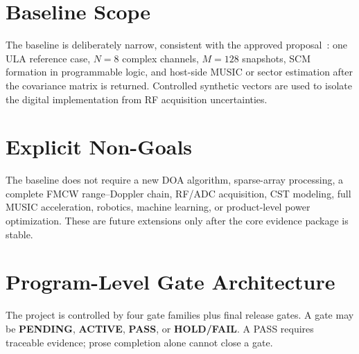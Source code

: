 \section{Baseline Scope}
The baseline is deliberately narrow, consistent with the approved proposal~\cite{molhem2026ee6800proposal}: one ULA reference case, $N=8$ complex channels,
$M=128$ snapshots, SCM formation in programmable logic, and host-side MUSIC or sector
estimation after the covariance matrix is returned. Controlled synthetic vectors are used to
isolate the digital implementation from RF acquisition uncertainties.

\section{Explicit Non-Goals}
The baseline does not require a new DOA algorithm, sparse-array processing, a complete
FMCW range--Doppler chain, RF/ADC acquisition, CST modeling, full MUSIC acceleration,
robotics, machine learning, or product-level power optimization. These are future extensions
only after the core evidence package is stable.

\section{Program-Level Gate Architecture}
The project is controlled by four gate families plus final release gates. A gate may be
\textbf{PENDING}, \textbf{ACTIVE}, \textbf{PASS}, or \textbf{HOLD/FAIL}. A PASS requires
traceable evidence; prose completion alone cannot close a gate.

